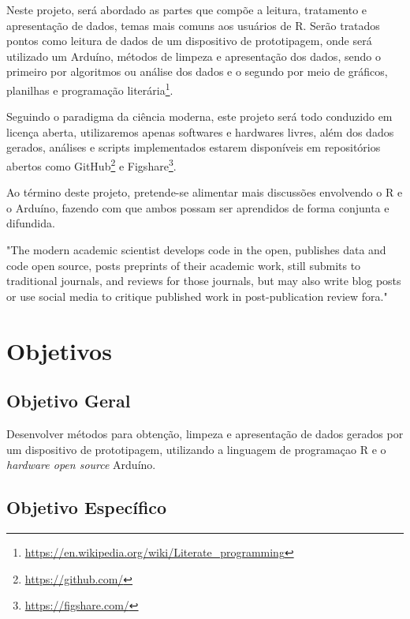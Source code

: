 \documentclass[
	article,			%
	11pt,				%
	oneside,			%
	a4paper,			%
	english,			%
	brazil,				%
	sumario=tradicional
	]{abntex2}
\begin{document}
Neste projeto, será abordado as partes que compõe a leitura, tratamento e 
apresentação de dados, temas mais comuns aos usuários de R. Serão tratados 
pontos como leitura de dados de um dispositivo de prototipagem, onde será 
utilizado um Arduíno, métodos de limpeza e apresentação dos dados, sendo o 
primeiro por 
algoritmos ou análise dos dados e o segundo por meio de gráficos, planilhas e 
programação 
literária\footnote{\url{https://en.wikipedia.org/wiki/Literate_programming}}.

Seguindo o paradigma da ciência moderna, este projeto será todo conduzido em 
licença aberta, utilizaremos apenas softwares e hardwares livres, além dos 
dados 
gerados, análises e scripts implementados estarem disponíveis em repositórios 
abertos como GitHub\footnote{\url{https://github.com/}} e 
Figshare\footnote{\url{https://figshare.com/}}.

Ao término deste projeto, pretende-se alimentar mais discussões envolvendo o R e o 
Arduíno, fazendo com que ambos possam ser aprendidos de forma conjunta e 
difundida. 

\begin{citacao}[english]
  "The modern academic scientist develops code in the open, publishes data and 
code open source, posts preprints of their academic work, still submits to 
traditional journals, and reviews for those journals, but may also write blog 
posts or use social media to critique published work in post-publication review 
fora."\cite{Peng2015}
\end{citacao}
\section[Objetivos]{Objetivos}

\subsection{Objetivo Geral}

Desenvolver métodos para obtenção, limpeza e apresentação de dados gerados por 
um dispositivo de prototipagem, utilizando a linguagem de programaçao R e o 
\emph{hardware open source} Arduíno.

\subsection{Objetivo Específico}
\end{document}

